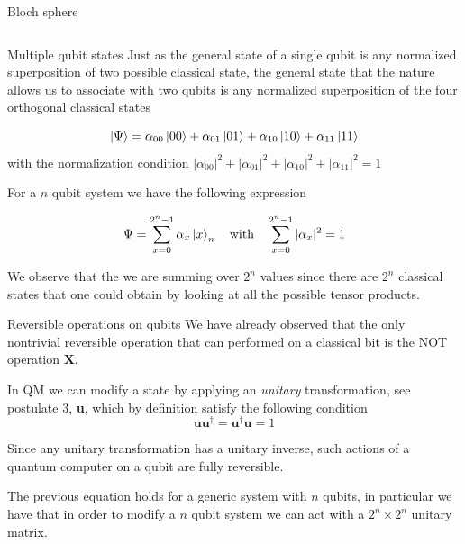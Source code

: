 \documentclass[11p,aspectratio=169]{beamer}
\begin{document}
\begin{frame}{Bloch sphere}
\begin{columns}
\begin{column}{0.4 \textwidth}
    \end{column}
    \end{columns}
    
\end{frame}

\begin{frame}{Multiple qubit states}
    Just as the general state of a single qubit is 
    any normalized superposition of two possible classical state, the general state that the nature
    allows us to associate with two qubits is any normalized superposition of
    the four orthogonal classical states

    $$ \ket{\Psi} = \alpha_{00} \ket{00}
                  + \alpha_{01} \ket{01}
                  + \alpha_{10} \ket{10}
                  + \alpha_{11} \ket{11}$$
    with the normalization condition 
    $ |\alpha_{00}|^2 + |\alpha_{01}|^2 + 
    |\alpha_{10}|^2 + |\alpha_{11}|^2 = 1$

    For a $n$ qubit system we have the following expression

    $$ \Psi = \sum_{x = 0}^{2^n - 1} \alpha_x \ket{x}_n \quad 
    \text{with} \quad \sum_{x = 0}^{2^n - 1} |\alpha_x|^2 = 1$$

    We observe that the we are summing over $2^n$ values since
    there are $2^n$ classical states that one could obtain by looking
    at all the possible tensor products.

\end{frame}

\begin{frame}{Reversible operations on qubits}
    We have already observed that the only nontrivial reversible operation
    that can performed on a classical bit is the NOT operation \textbf{X}.
    
    In QM we can modify a state by applying an \emph{unitary} transformation, see postulate 3,
    \textbf{u}, which by definition satisfy the following condition
    $$ \textbf{u} \textbf{u}^\dagger = \textbf{u}^\dagger \textbf{u} = 1  $$

    Since any unitary transformation has a unitary inverse, such actions of a quantum
    computer on a qubit are fully reversible.

    The previous equation holds for a generic system with $n$ qubits, in particular we
    have that in order to modify a $n$ qubit system we can act with a $2^n \times 2^n$ unitary matrix.
\end{frame}
\end{document}
